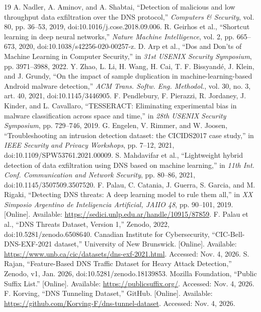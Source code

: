 \begin{thebibliography}{19}
 A. Nadler, A. Aminov, and A. Shabtai, ``Detection of malicious and low throughput data exfiltration over the DNS protocol,'' \emph{Computers \& Security}, vol. 80, pp. 36--53, 2019, doi:10.1016/j.cose.2018.09.006.
 R. Geirhos et al., ``Shortcut learning in deep neural networks,'' \emph{Nature Machine Intelligence}, vol. 2, pp. 665--673, 2020, doi:10.1038/s42256-020-00257-z.
 D. Arp et al., ``Dos and Don'ts of Machine Learning in Computer Security,'' in \emph{31st USENIX Security Symposium}, pp. 3971--3988, 2022.
 Y. Zhao, L. Li, H. Wang, H. Cai, T. F. Bissyandé, J. Klein, and J. Grundy, ``On the impact of sample duplication in machine-learning-based Android malware detection,'' \emph{ACM Trans. Softw. Eng. Methodol.}, vol. 30, no. 3, art. 40, 2021, doi:10.1145/3446905.
 F. Pendlebury, F. Pierazzi, R. Jordaney, J. Kinder, and L. Cavallaro, ``TESSERACT: Eliminating experimental bias in malware classification across space and time,'' in \emph{28th USENIX Security Symposium}, pp. 729--746, 2019.
 G. Engelen, V. Rimmer, and W. Joosen, ``Troubleshooting an intrusion detection dataset: the CICIDS2017 case study,'' in \emph{IEEE Security and Privacy Workshops}, pp. 7--12, 2021, doi:10.1109/SPW53761.2021.00009.
 S. Mahdavifar et al., ``Lightweight hybrid detection of data exfiltration using DNS based on machine learning,'' in \emph{11th Int. Conf. Communication and Network Security}, pp. 80--86, 2021, doi:10.1145/3507509.3507520.
 F. Palau, C. Catania, J. Guerra, S. Garcia, and M. Rigaki, ``Detecting DNS threats: A deep learning model to rule them all,'' in \emph{XX Simposio Argentino de Inteligencia Artificial, JAIIO 48}, pp. 90--101, 2019. [Online]. Available: \url{https://sedici.unlp.edu.ar/handle/10915/87859}.
 F. Palau et al., ``DNS Threats Dataset, Version 1,'' Zenodo, 2022, doi:10.5281/zenodo.6508640.
 Canadian Institute for Cybersecurity, ``CIC-Bell-DNS-EXF-2021 dataset,'' University of New Brunswick. [Online]. Available: \url{https://www.unb.ca/cic/datasets/dns-exf-2021.html}. Accessed: Nov. 4, 2026.
 S. Rajan, ``Feature-Based DNS Traffic Dataset for Heavy Attack Detection,'' Zenodo, v1, Jan. 2026, doi:10.5281/zenodo.18139853.
 Mozilla Foundation, ``Public Suffix List.'' [Online]. Available: \url{https://publicsuffix.org/}. Accessed: Nov. 4, 2026.
 F. Korving, ``DNS Tunneling Dataset,'' GitHub. [Online]. Available: \url{https://github.com/Korving-F/dns-tunnel-dataset}. Accessed: Nov. 4, 2026.

\end{thebibliography}
